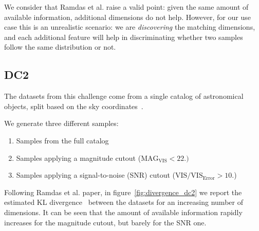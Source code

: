 We consider that Ramdas et al. raise a valid point: given the same amount of available
information, additional dimensions do not help. However, for our \PresQ use case this is an
unrealistic scenario: we are \emph{discovering} the matching dimensions, and each additional
feature will help in discriminating whether two samples follow the same distribution or not.

\subsection{DC2}
The datasets from this challenge come from a single catalog of astronomical
objects, split based on the sky coordinates~\cite{EuclidDesprez2020}.

We generate three different samples:

\begin{enumerate}
    \item Samples from the full catalog
    \item Samples applying a magnitude cutout ($\text{MAG}_\text{VIS} < 22.)$
    \item Samples applying a signal-to-noise (SNR) cutout ($\text{VIS} / \text{VIS}_\text{Error} > 10.$)
\end{enumerate}

Following Ramdas et al. paper, in figure~\ref{fig:divergence_dc2} we report
the estimated KL divergence~\cite{perez2008kullback} between the datasets for an
increasing number of dimensions. It can be seen that the amount of available information
rapidly increases for the magnitude cutout, but barely for the SNR one.

